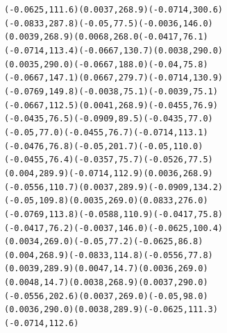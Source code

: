 \documentclass[twocolumn,10pt,russian]{/usr/lib/python3.3/site-packages/sphinx/texinputs/sphinxhowto}
\newenvironment{InvisibleVerbatim}
        {\begin{mdframed}[leftmargin=0.1\linewidth,innerleftmargin=3pt,innerrightmargin=3pt, userdefinedwidth=1\linewidth, linewidth=0pt, linecolor=white, usetwoside=false]}
        {\end{mdframed}}
\begin{document}
    

        
        

            
                \begin{InvisibleVerbatim}
                \vspace{-0\baselineskip}
\begin{alltt}
(-0.0625, 111.6)       (0.0037, 268.9)          (-0.0714, 300.6)
(-0.0833, 287.8)       (-0.05, 77.5)          (-0.0036, 146.0)
(0.0039, 268.9)       (0.0068, 268.0          (-0.0417, 76.1)
(-0.0714, 113.4)       (-0.0667, 130.7)          (0.0038, 290.0)
(0.0035, 290.0)       (-0.0667, 188.0)          (-0.04, 75.8)
(-0.0667, 147.1)       (0.0667, 279.7)         (-0.0714, 130.9)
(-0.0769, 149.8)       (-0.0038, 75.1)         (-0.0039, 75.1)
(-0.0667, 112.5)       (0.0041, 268.9)         (-0.0455, 76.9)
(-0.0435, 76.5)       (-0.0909, 89.5)         (-0.0435, 77.0)
(-0.05, 77.0)       (-0.0455, 76.7)         (-0.0714, 113.1)
(-0.0476, 76.8)       (-0.05, 201.7)         (-0.05, 110.0)
(-0.0455, 76.4)       (-0.0357, 75.7)         (-0.0526, 77.5)
(0.004, 289.9)       (-0.0714, 112.9)         (0.0036, 268.9)
(-0.0556, 110.7)       (0.0037, 289.9)         (-0.0909, 134.2)
(-0.05, 109.8)       (0.0035, 269.0)         (0.0833, 276.0)
(-0.0769, 113.8)       (-0.0588, 110.9)         (-0.0417, 75.8)
(-0.0417, 76.2)       (-0.0037, 146.0)         (-0.0625, 100.4)
(0.0034, 269.0)       (-0.05, 77.2)         (-0.0625, 86.8)
(0.004, 268.9)       (-0.0833, 114.8)         (-0.0556, 77.8)
(0.0039, 289.9)       (0.0047, 14.7)         (0.0036, 269.0)
(0.0048, 14.7)       (0.0038, 268.9)         (0.0037, 290.0)
(-0.0556, 202.6)       (0.0037, 269.0)         (-0.05, 98.0)
(0.0036, 290.0)       (0.0038, 289.9)         (-0.0625, 111.3)
(-0.0714, 112.6)
\end{alltt}

            \end{InvisibleVerbatim}
            
        
    


\end{document}

